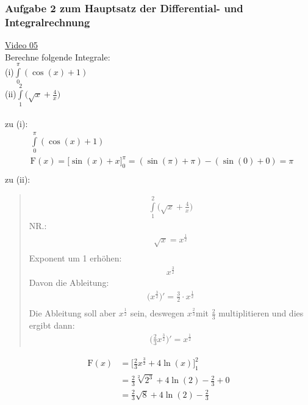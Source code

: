 \subsubsection{ Aufgabe 2 zum Hauptsatz der Differential- und Integralrechnung}
\href{https://youtu.be/O-x6XCl7v-c}{Video 05}\\
Berechne folgende Integrale:\\
(i)\;\;$ \int\limits_{0}^{\pi} (\cos(x)+1) $\\
(ii)\;$ \int\limits_{1}^{2} \big(\sqrt{x}+\frac{4}{x}\big)$ \\
\\
zu (i):\\
\begin{align*}
&\int\limits_{0}^{\pi} (\cos(x)+1)\\
&\mathrm{F}(x)=\bigg[\sin(x)+x\bigg]^\pi_0=(\sin(\pi)+\pi)-(\sin(0)+0)=\pi\\
\end{align*}
zu (ii):\\
\begin{quote}
	
	\begin{align*}
	\int\limits_{1}^{2} \bigg(\sqrt{x}+\frac{4}{x}\bigg)
	\end{align*}
	NR.:\\
	\begin{align*}
	\sqrt{x}=x^{\frac{1}{2}}\\
	\end{align*}
	Exponent um 1 erhöhen:\\
	\begin{align*}
	x^{\frac{3}{2}}
	\end{align*}
	Davon die Ableitung:\\
	\begin{align*}
	\bigg(x^{\frac{3}{2}}\bigg)'=\frac{3}{2}\cdot x^{\frac{1}{2}}\\
	\end{align*}
	Die Ableitung soll aber $ x^{\frac{1}{2}} $ sein, deswegen $ x^{\frac{2}{3}} $mit $ \frac{2}{3} $ multiplitieren und dies ergibt dann:\\
	\begin{align*}
	\bigg(\frac{2}{3}x^{\frac{3}{2}}\bigg)'=x^{\frac{1}{2}}
	\end{align*}
\end{quote}
\begin{align*}
\mathrm{F}(x)&=\bigg[\frac{2}{3}x^{\frac{3}{2}}+4\ln(x)\bigg]^2_1\\
&=\frac{2}{3}\sqrt[2]{2^3}+4\ln(2)-\frac{2}{3}+0\\
&=\frac{2}{3}\sqrt{8}+4\ln(2)-\frac{2}{3}
\end{align*}
